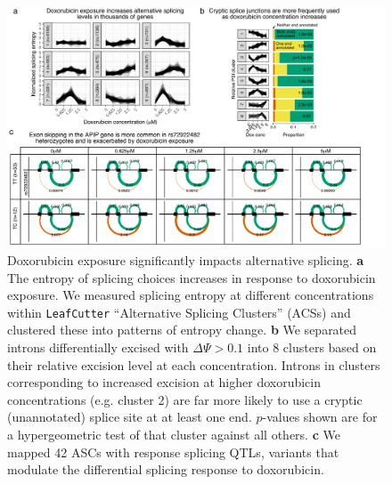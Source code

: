 \documentclass[9pt,lineno]{elife}
\begin{document}
\begin{figure}
\begin{fullwidth}
    \includegraphics[width=1\linewidth]{../figures/fig3_splicing.pdf}     \caption{Doxorubicin exposure significantly impacts alternative splicing. \textbf{a} The entropy of splicing choices increases in response to doxorubicin exposure. We measured splicing entropy at different concentrations within \texttt{LeafCutter} ``Alternative Splicing Clusters'' (ACSs) and clustered these into patterns of entropy change. \textbf{b} We separated introns differentially excised with $\Delta \Psi > 0.1$ into 8 clusters based on their relative excision level at each concentration. Introns in clusters corresponding to increased excision at higher doxorubicin concentrations (e.g. cluster 2) are far more likely to use a cryptic (unannotated) splice site at at least one end. $p$-values shown are for a hypergeometric test of that cluster against all others. \textbf{c} We mapped 42 ASCs with response splicing QTLs, variants that modulate the differential splicing response to doxorubicin.}
    \label{fig:splicing}

\end{fullwidth}
\end{figure}
\end{document}
